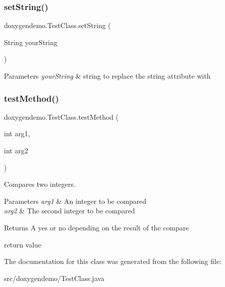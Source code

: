 \subsubsection{\texorpdfstring{set\+String()}{setString()}}
{\footnotesize\ttfamily doxygendemo.\+Test\+Class.\+set\+String (\begin{DoxyParamCaption}\item[{String}]{your\+String }\end{DoxyParamCaption})}


\begin{DoxyParams}{Parameters}
{\em your\+String} & string to replace the string attribute with \\
\hline
\end{DoxyParams}
\mbox{\label{classdoxygendemo_1_1_test_class_abbd911a5398278ff404a9f08935debbb}} 
\subsubsection{\texorpdfstring{test\+Method()}{testMethod()}}
{\footnotesize\ttfamily doxygendemo.\+Test\+Class.\+test\+Method (\begin{DoxyParamCaption}\item[{int}]{arg1,  }\item[{int}]{arg2 }\end{DoxyParamCaption})}



Compares two integers. 


\begin{DoxyParams}{Parameters}
{\em arg1} & An integer to be compared \\
\hline
{\em arg2} & The second integer to be compared \\
\hline
\end{DoxyParams}
\begin{DoxyReturn}{Returns}
A yes or no depending on the result of the compare 
\end{DoxyReturn}
return value 

The documentation for this class was generated from the following file\+:\begin{DoxyCompactItemize}
\item 
src/doxygendemo/Test\+Class.\+java\end{DoxyCompactItemize}
